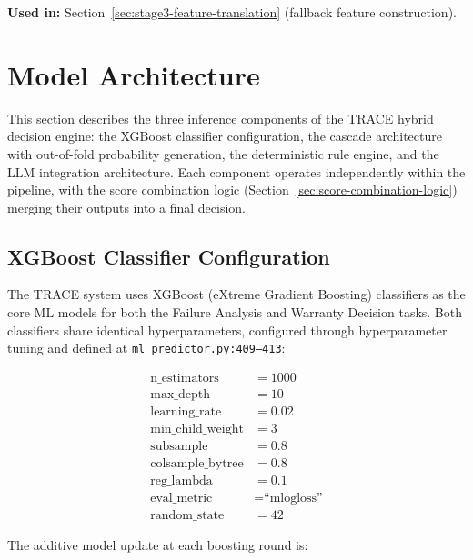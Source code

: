 \documentclass[10pt,a4paper]{article}
\begin{document}
\textbf{Used in:} Section~\ref{sec:stage3-feature-translation} (fallback feature construction).

\section{Model Architecture}
\label{sec:model-architecture}

This section describes the three inference components of the TRACE hybrid decision engine: the XGBoost classifier configuration, the cascade architecture with out-of-fold probability generation, the deterministic rule engine, and the LLM integration architecture. Each component operates independently within the pipeline, with the score combination logic (Section~\ref{sec:score-combination-logic}) merging their outputs into a final decision.

\subsection{XGBoost Classifier Configuration}
\label{sec:xgboost-configuration}

The TRACE system uses XGBoost (eXtreme Gradient Boosting) classifiers as the core ML models for both the Failure Analysis and Warranty Decision tasks. Both classifiers share identical hyperparameters, configured through hyperparameter tuning and defined at \texttt{ml\_predictor.py:409--413}:

\begin{align}
\text{n\_estimators}      &= 1000 \label{eq:xgb-nest} \\
\text{max\_depth}         &= 10   \label{eq:xgb-depth} \\
\text{learning\_rate}     &= 0.02 \label{eq:xgb-lr} \\
\text{min\_child\_weight} &= 3    \label{eq:xgb-mcw} \\
\text{subsample}          &= 0.8  \label{eq:xgb-sub} \\
\text{colsample\_bytree}  &= 0.8  \label{eq:xgb-col} \\
\text{reg\_lambda}        &= 0.1  \label{eq:xgb-l2} \\
\text{eval\_metric}       &= \text{``mlogloss''} \label{eq:xgb-metric} \\
\text{random\_state}      &= 42   \label{eq:xgb-rs}
\end{align}

The additive model update at each boosting round is:
\end{document}

